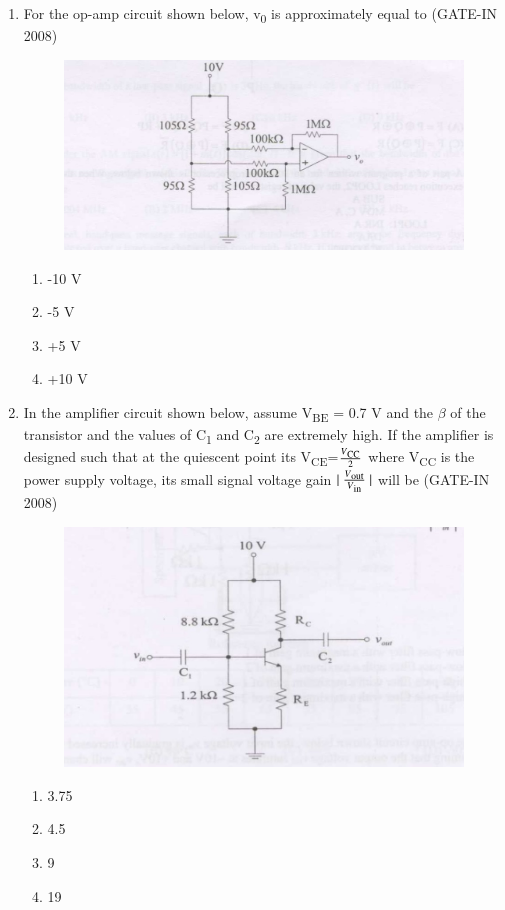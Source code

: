 \documentclass[journal,12pt,onecolumn]{IEEEtran}
\theoremstyle{remark}
\begin{document}
\begin{enumerate}
    \item  For the op-amp circuit shown below, v\textsubscript{0} is approximately equal to (GATE-IN 2008)
    \begin{figure}[H]
    \centering
    \includegraphics[width=0.5\columnwidth]{figs/i21.jpg}
    \caption{}
    \label{fig:placeholder21}
\end{figure}
\begin{multicols}{4}
    \begin{enumerate} 
        \item -10 V
        \item  -5 V
        \item  +5 V
        \item +10 V
    \end{enumerate}
    \end{multicols}
    
    \item  In the amplifier circuit shown below, assume V\textsubscript{BE} = 0.7 V and the $\beta$ of the transistor and the values
of C\textsubscript{1} and C\textsubscript{2} are extremely high. If the amplifier is designed such that at the quiescent point its V\textsubscript{CE}=\(\frac{V\textsubscript{CC}}{2}\) where V\textsubscript{CC}  is the power supply voltage, its small signal voltage gain $\lvert \ \frac{V\textsubscript{out}}{V\textsubscript{in}}\  \rvert$ will be (GATE-IN 2008)
\begin{figure}[H]
    \centering
    \includegraphics[width=0.5\columnwidth]{figs/i22.jpg}
    \caption{}
    \label{fig:placeholder22}
\end{figure}
\begin{multicols}{4}
    \begin{enumerate} 
        \item 3.75
        \item  4.5
        \item  9
        \item 19
    \end{enumerate}
    \end{multicols}
    

\end{enumerate}
\end{document}
